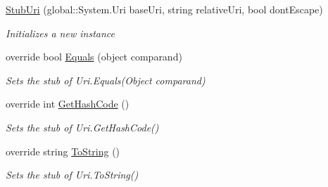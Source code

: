 \begin{DoxyCompactItemize}
\hyperlink{class_system_1_1_fakes_1_1_stub_uri_afe4e73d1063e8a7c6c6f1d799f57883c}{Stub\-Uri} (global\-::\-System.\-Uri base\-Uri, string relative\-Uri, bool dont\-Escape)
\begin{DoxyCompactList}\small\item\em Initializes a new instance\end{DoxyCompactList}\item 
override bool \hyperlink{class_system_1_1_fakes_1_1_stub_uri_abaaf9c23fcb023a78a66e0b5a2ddfee8}{Equals} (object comparand)
\begin{DoxyCompactList}\small\item\em Sets the stub of Uri.\-Equals(\-Object comparand)\end{DoxyCompactList}\item 
override int \hyperlink{class_system_1_1_fakes_1_1_stub_uri_a90768f097c35e6ebb031d5d72c4d6dc3}{Get\-Hash\-Code} ()
\begin{DoxyCompactList}\small\item\em Sets the stub of Uri.\-Get\-Hash\-Code()\end{DoxyCompactList}\item 
override string \hyperlink{class_system_1_1_fakes_1_1_stub_uri_a92e36242e2ca3c10dccc60d05af09dbc}{To\-String} ()
\begin{DoxyCompactList}\small\item\em Sets the stub of Uri.\-To\-String()\end{DoxyCompactList}\end{DoxyCompactItemize}
